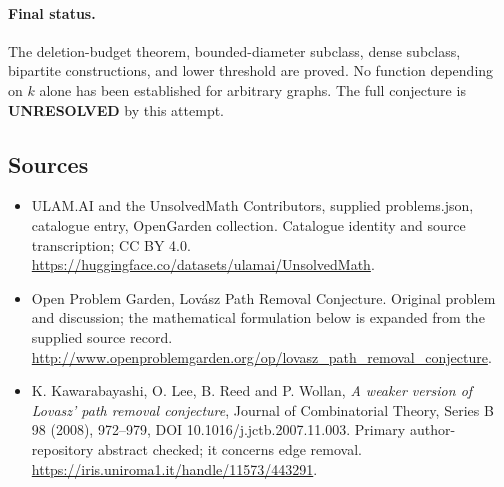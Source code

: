 \documentclass[11pt,a4paper]{article}
\begin{document}
\paragraph{Final status.}
The deletion-budget theorem, bounded-diameter subclass, dense subclass, bipartite constructions, and lower threshold are proved. No function depending on $k$ alone has been established for arbitrary graphs. The full conjecture is \textbf{UNRESOLVED} by this attempt.

\subsection{Sources}
\begin{itemize}
\item[S1] ULAM.AI and the UnsolvedMath Contributors, supplied problems.json, catalogue entry, OpenGarden collection. Catalogue identity and source transcription; CC BY 4.0.
\url{https://huggingface.co/datasets/ulamai/UnsolvedMath}.
\item[S2] Open Problem Garden, Lovász Path Removal Conjecture. Original problem and discussion; the mathematical formulation below is expanded from the supplied source record.
\url{http://www.openproblemgarden.org/op/lovasz_path_removal_conjecture}.
\item[R1] K. Kawarabayashi, O. Lee, B. Reed and P. Wollan, \emph{A weaker version of Lovasz' path removal conjecture}, Journal of Combinatorial Theory, Series B 98 (2008), 972--979, DOI 10.1016/j.jctb.2007.11.003. Primary author-repository abstract checked; it concerns edge removal.
\url{https://iris.uniroma1.it/handle/11573/443291}.
\end{itemize}
\end{document}
